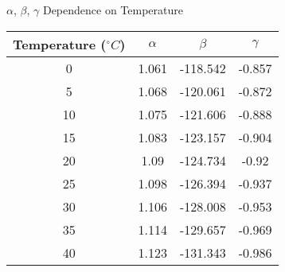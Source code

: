 \documentclass{amsart}
\begin{document}
\huge
\begin{center}
$\alpha$, $\beta$, $\gamma$ Dependence on Temperature
\end{center}
\normalsize

\begin{table}[H]
\centering
\begin{tabular}{ c | c | c | c  }
\hline \hline
Temperature ($^{\circ}C$) & $\alpha$ & $\beta$ & $\gamma$ \\
\hline
0 & 1.061 & -118.542 & -0.857\\
\hline
5 & 1.068 & -120.061 & -0.872\\
\hline
10 & 1.075 & -121.606 & -0.888 \\
\hline
15 & 1.083 & -123.157 & -0.904 \\
\hline
20 & 1.09 & -124.734 & -0.92 \\
\hline
25 & 1.098 & -126.394 & -0.937 \\
\hline
30 & 1.106 & -128.008 & -0.953 \\
\hline
35 & 1.114 & -129.657 & -0.969 \\
\hline
40 & 1.123 & -131.343 & -0.986 \\
\hline \hline
\end{tabular}
\end{table}
\end{document}
